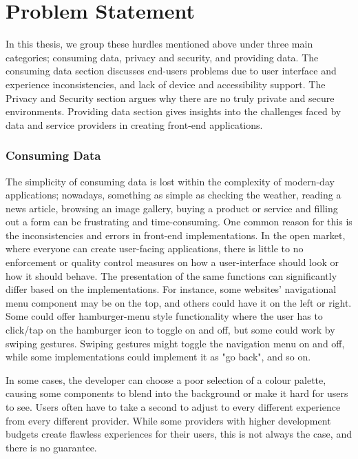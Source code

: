 
\section{Problem Statement} \label{problemStatement}

In this thesis, we group these hurdles mentioned above under three main categories; consuming data, privacy and security, and providing data. The consuming data section discusses end-users problems due to user interface and experience inconsistencies, and lack of device and accessibility support. The Privacy and Security section argues why there are no truly private and secure environments. Providing data section gives insights into the challenges faced by data and service providers in creating front-end applications.

\subsubsection{Consuming Data}

The simplicity of consuming data is lost within the complexity of modern-day applications; nowadays, something as simple as checking the weather, reading a news article, browsing an image gallery, buying a product or service and filling out a form can be frustrating and time-consuming. One common reason for this is the inconsistencies and errors in front-end implementations. In the open market, where everyone can create user-facing applications, there is little to no enforcement or quality control measures on how a user-interface should look or how it should behave. The presentation of the same functions can significantly differ based on the implementations. For instance, some websites' navigational menu component may be on the top, and others could have it on the left or right. Some could offer hamburger-menu style functionality where the user has to click/tap on the hamburger icon to toggle on and off, but some could work by swiping gestures. Swiping gestures might toggle the navigation menu on and off, while some implementations could implement it as "go back", and so on. 

In some cases, the developer can choose a poor selection of a colour palette, causing some components to blend into the background or make it hard for users to see. Users often have to take a second to adjust to every different experience from every different provider. While some providers with higher development budgets create flawless experiences for their users, this is not always the case, and there is no guarantee.

